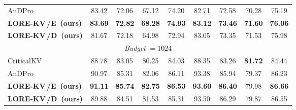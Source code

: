 \documentclass{article} %
\newcommand{\best}[1]{\textcolor{bestblue}{\textbf{#1}}}
\newcommand{\second}[1]{\textcolor{secondorange}{#1}}
\newcommand{\lorekvE}{LORE-KV\,/E}
\newcommand{\lorekvD}{LORE-KV\,/D}
\begin{document}
\begin{table}[t]
\begin{tabular}{lcccccccc}
AnDPro
& \second{83.42} & 72.06 & \second{67.12} & \second{74.20}
& 82.71 & 72.58 & 70.28 & 75.19 \\

\textbf{\lorekvE\ (ours)}
& \best{83.69} & \best{72.82} & \best{68.28} & \best{74.93}
& \best{83.12} & \best{73.46} & \best{71.60} & \best{76.06} \\

\textbf{\lorekvD\ (ours)}
& 81.67 & \second{72.18} & 64.98 & 72.94
& \second{83.05} & \second{73.35} & \second{71.53} & \second{75.98} \\

\midrule
\multicolumn{9}{c}{\textit{Budget} $=1024$} \\
\midrule
CriticalKV
& 88.78 & 83.05 & 80.25 & 84.03
& 88.35 & 83.26 & \best{81.72} & 84.44 \\

AnDPro
& \second{90.97} & \second{85.31} & \second{82.06} & \second{86.11}
& 93.38 & 85.94 & 79.37 & 86.23 \\

\textbf{\lorekvE\ (ours)}
& \best{91.11} & \best{85.74} & \best{82.75} & \best{86.53}
& \best{93.60} & \best{86.40} & \second{79.98} & \best{86.66} \\

\textbf{\lorekvD\ (ours)}
& 89.88 & 84.51 & 81.53 & 85.31
& \second{93.50} & \second{86.29} & 79.87 & \second{86.55} \\

\bottomrule
\end{tabular}
\end{table}
\end{document}
